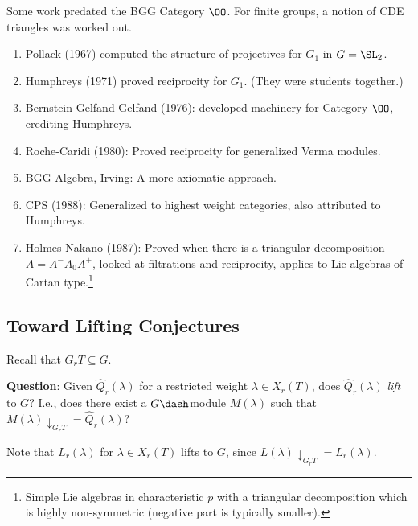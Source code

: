 \begin{remark}

Some work predated the BGG Category \(\OO\). For finite groups, a notion
of CDE triangles was worked out.

\begin{enumerate}
\def\labelenumi{\arabic{enumi}.}
\item
  Pollack (1967) computed the structure of projectives for \(G_1\) in
  \(G = \SL_2\).
\item
  Humphreys (1971) proved reciprocity for \(G_1\). (They were students
  together.)
\item
  Bernstein-Gelfand-Gelfand (1976): developed machinery for Category
  \(\OO\), crediting Humphreys.
\item
  Roche-Caridi (1980): Proved reciprocity for generalized Verma modules.
\item
  BGG Algebra, Irving: A more axiomatic approach.
\item
  CPS (1988): Generalized to highest weight categories, also attributed
  to Humphreys.
\item
  Holmes-Nakano (1987): Proved when there is a triangular decomposition
  \(A = A^- A_0 A^+\), looked at filtrations and reciprocity, applies to
  Lie algebras of Cartan type.\footnote{Simple Lie algebras in
    characteristic \(p\) with a triangular decomposition which is highly
    non-symmetric (negative part is typically smaller).}
\end{enumerate}

\end{remark}

\hypertarget{toward-lifting-conjectures}{%
\subsection{Toward Lifting
Conjectures}\label{toward-lifting-conjectures}}

Recall that \(G_r T \subseteq G\).

\textbf{Question}: Given \(\hat{Q}_r(\lambda)\) for a restricted weight
\(\lambda \in X_r(T)\), does \(\hat{Q}_r(\lambda)\) \emph{lift} to
\(G\)? I.e., does there exist a \(G\dash\)module \(M(\lambda)\) such
that \(M(\lambda)\downarrow_{G_r T} = \hat{Q}_r(\lambda)\)?

\begin{remark}

Note that \(L_r(\lambda)\) for \(\lambda\in X_r(T)\) lifts to \(G\),
since \(L(\lambda)\downarrow_{G_r T} = \hat{L}_r(\lambda)\).

\end{remark}

